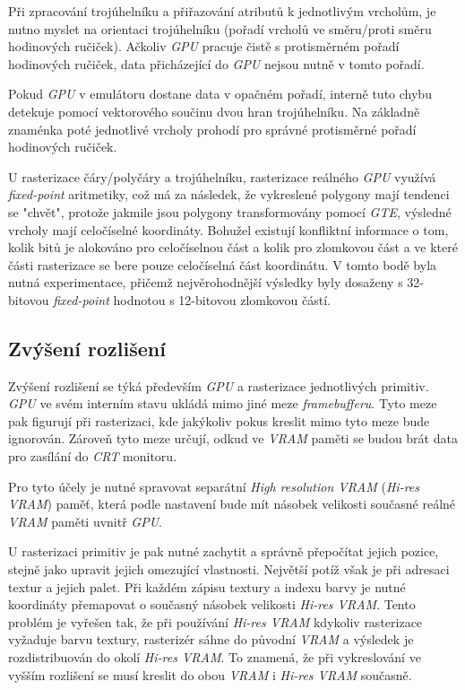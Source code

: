 Při zpracování trojúhelníku a přiřazování atributů k jednotlivým vrcholům, je nutno
myslet na orientaci trojúhelníku (pořadí vrcholů ve směru/proti směru hodinových ručiček).
Ačkoliv \textit{GPU} pracuje čistě s protisměrném pořadí hodinových ručiček, data
přicházející do \textit{GPU} nejsou nutně v tomto pořadí.

Pokud \textit{GPU} v emulátoru dostane data v opačném pořadí, interně tuto chybu detekuje pomocí
vektorového součinu dvou hran trojúhelníku. Na základně znaménka poté jednotlivé
vrcholy prohodí pro správné protisměrné pořadí hodinových ručiček.

U rasterizace čáry/polyčáry a trojúhelníku, rasterizace reálného \textit{GPU} využívá
\textit{fixed-point} aritmetiky, což má za následek, že vykreslené polygony mají tendenci
se "chvět", protože jakmile jsou polygony transformovány pomocí \textit{GTE}, výsledné
vrcholy mají celočíselné koordináty. Bohužel existují konfliktní informace o tom,
kolik bitů je alokováno pro celočíselnou část a kolik pro zlomkovou část a ve které
části rasterizace se bere pouze celočíselná část koordinátu. V tomto bodě byla nutná
experimentace, přičemž nejvěrohodnější výsledky byly dosaženy s 32-bitovou \textit{fixed-point}
hodnotou s 12-bitovou zlomkovou částí.

\subsection{Zvýšení rozlišení}

Zvýšení rozlišení se týká především \textit{GPU} a rasterizace jednotlivých primitiv. 
\textit{GPU} ve svém interním stavu ukládá mimo jiné meze \textit{framebufferu}. 
Tyto meze pak figurují při rasterizaci, kde jakýkoliv pokus kreslit mimo tyto meze bude ignorován. 
Zároveň tyto meze určují, odkud ve \textit{VRAM} paměti se budou brát data pro zasílání 
do \textit{CRT} monitoru.

Pro tyto účely je nutné spravovat separátní \textit{High resolution VRAM} (\textit{Hi-res VRAM}) paměť, která podle nastavení 
bude mít násobek velikosti současné reálné \textit{VRAM} paměti uvnitř \textit{GPU}.

U rasterizaci primitiv je pak nutné zachytit a správně přepočítat jejich pozice, stejně jako 
upravit jejich omezující vlastnosti. Největší potíž však je při adresaci textur a jejich palet. 
Při každém zápisu textury a indexu barvy je nutné koordináty přemapovat o současný násobek velikosti \textit{Hi-res VRAM}. Tento problém je vyřešen tak, že při používání \textit{Hi-res VRAM} kdykoliv rasterizace vyžaduje barvu textury, rasterizér sáhne do původní \textit{VRAM} a výsledek je rozdistribuován do okolí \textit{Hi-res VRAM}. 
To znamená, že při vykreslování ve vyšším rozlišení se musí kreslit do obou \textit{VRAM} i \textit{Hi-res VRAM} současně.

